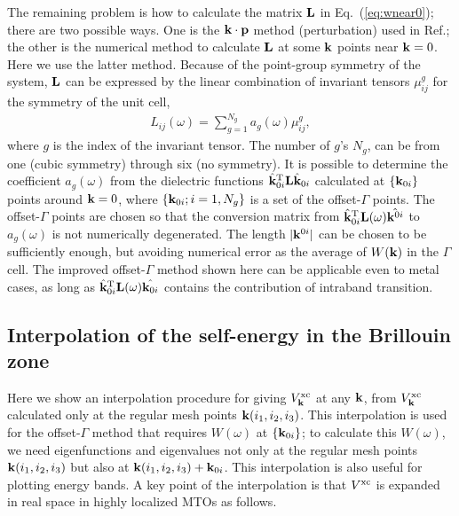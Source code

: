 \documentclass[a4paper,10pt,epsf,fleqn]{article}
\def\vxc{V^{\rm xc}}
\def\bfp{{\bf p}}
\newcommand{\bfq}{{\bf q}}
\newcommand{\bfk}{{\bf k}}
\newcommand{\req}[1]{\mbox{Eq.~(\ref{#1})}}
\begin{document}
The remaining problem is how to calculate
the matrix ${\bf L}$ in \req{eq:wnear0}; there are two possible ways.
One is the $\bfk \cdot \bfp$ method (perturbation) used in Ref.\cite{friedrich_efficient_2010}; 
the other is the numerical method to calculate ${\bf L}$ at some
$\bfk$ points near $\bfk=0$. Here we use the latter method.
Because of the point-group symmetry of the system, ${\bf L}$ can be expressed by the
linear combination of invariant tensors $\mu_{ij}^g$ for the symmetry of the unit cell,
\begin{eqnarray}
L_{ij}(\omega)=  \sum_{g=1}^{N_g} a_g(\omega) \mu_{ij}^g,
\end{eqnarray}
where $g$ is the index of the invariant tensor. 
The number of $g$'s $N_g$, can be
from one (cubic symmetry) through six (no symmetry).
It is possible to determine the coefficient $a_g(\omega)$
from the dielectric functions ${\hat{\bfk}_{0i}}^{\rm T}{\bf L}\hat{\bfk}_{0i}$
calculated at $\{\bfk_{0i}\}$ points around
$\bfk=0$, where $\{\bfk_{0i}; i=1,N_g\}$ is a set of the offset-$\Gamma$ points.
The offset-$\Gamma$ points are chosen so that the conversion matrix
from $\hat{\bfk}_{0i}^{\rm T}{\bf L}(\omega)\hat{\bfk^{0i}}$ to $a_g(\omega)$
is not numerically degenerated. The length $|\bfk^{0i}|$
can be chosen to be sufficiently enough, but avoiding numerical error
%
as the average of $W(\bfk)$ in the $\Gamma$ cell.
The improved offset-$\Gamma$ method shown here can be applicable even to metal cases, as long as
$\hat{\bfk}_{0i}^{\rm T}{\bf L}(\omega)\hat{\bfk_{0i}}$ contains the contribution
of intraband transition.


\subsection{Interpolation of the self-energy in the Brillouin zone}
\label{sec:siginterp}
Here we show 
an interpolation procedure for giving
$\vxc_{\bfk}$ at any $\bfk$,
from $\vxc_{\bfk}$ calculated only at the regular mesh points $\bfk(i_1,i_2,i_3)$.
This interpolation is used for the offset-$\Gamma$ method that
requires $W(\omega)$ at $\{\bfk_{0i}\}$;
to calculate this $W(\omega)$, we need 
eigenfunctions and eigenvalues not only 
at the regular mesh points $\bfk(i_1,i_2,i_3)$
but also at $\bfk(i_1,i_2,i_3)+\bfk_{0i}$. 
This interpolation is also useful for plotting
energy bands. %
A key point of the interpolation is that $\vxc$ 
is expanded in real space in highly localized MTOs as follows.
\end{document}
